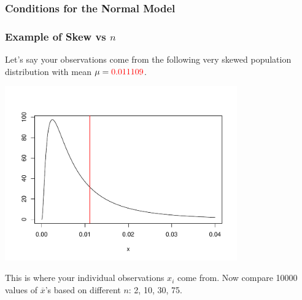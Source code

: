 \documentclass[handout]{beamer}
\newcommand{\blue}[1]{\textcolor{blue2}{#1}}
\newcommand{\xbar}{\overline{x}}
\begin{document}
\begin{frame}
\frametitle{Conditions for the Normal Model}

%
%
%

\end{frame}


\begin{frame}
\frametitle{Example of Skew vs $n$}
Let's say your observations come from the following very skewed \blue{population distribution} with mean $\mu=\textcolor{red}{0.011109}$. 
\begin{center}
\pause\includegraphics[width=0.75\textwidth]{figure/true.pdf}
\end{center}
\pause  This is where your individual observations $x_i$ come from.  \pause Now compare 10000 values of $\xbar$'s based on different $n$:  2, 10, 30, 75.   
\end{frame}
\end{document}
